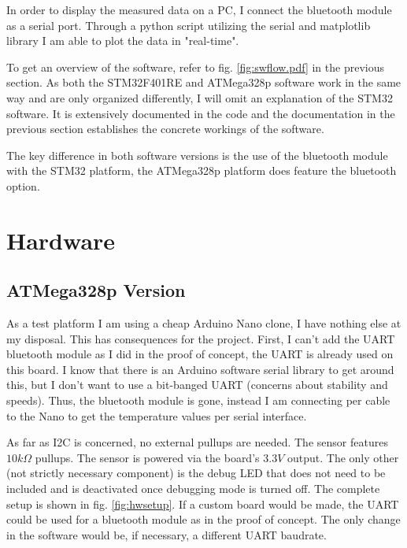 \documentclass{article}[12pt]
\begin{document}
In order to display the measured data on a PC, I connect the bluetooth module as a serial port. Through a python script utilizing the serial and matplotlib library I am able to plot the data in "real-time".

To get an overview of the software, refer to fig. \ref{fig:swflow.pdf} in the previous section. As both the STM32F401RE and ATMega328p software work in the same way and are only organized differently, I will omit an explanation of the STM32 software. It is extensively documented in the code and the documentation in the previous section establishes the concrete workings of the software.

The key difference in both software versions is the use of the bluetooth module with the STM32 platform, the ATMega328p platform does feature the bluetooth option.

\section{Hardware}

\subsection{ATMega328p Version}

As a test platform I am using a cheap Arduino Nano clone, I have nothing else at my disposal. This has consequences for the project. First, I can't add the UART bluetooth module as I did in the proof of concept, the UART is already used on this board. I know that there is an Arduino software serial library to get around this, but I don't want to use a bit-banged UART (concerns about stability and speeds). Thus, the bluetooth module is gone, instead I am connecting per cable to the Nano to get the temperature values per serial interface.

As far as I2C is concerned, no external pullups are needed. The sensor features $10k\Omega$ pullups. The sensor is powered via the board's $3.3V$ output. The only other (not strictly necessary component) is the debug LED that does not need to be included and is deactivated once debugging mode is turned off. The complete setup is shown in fig. \ref{fig:hwsetup}. If a custom board would be made, the UART could be used for a bluetooth module as in the proof of concept. The only change in the software would be, if necessary, a different UART baudrate.
\end{document}
